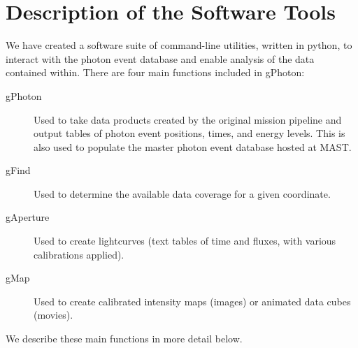 \documentclass[preprint]{aastex}
\begin{document}
\section{Description of the Software Tools}
\label{softwaretools}
We have created a software suite of command-line utilities, written in python, to interact with the photon event database and enable analysis of the data contained within.  There are four main functions included in gPhoton:
\begin{description}
\item[gPhoton] Used to take data products created by the original mission pipeline and output tables of photon event positions, times, and energy levels.  This is also used to populate the master photon event database hosted at MAST.
\item[gFind] Used to determine the available data coverage for a given coordinate.
\item[gAperture] Used to create lightcurves (text tables of time and fluxes, with various calibrations applied).
\item[gMap] Used to create calibrated intensity maps (images) or animated data cubes (movies).
\end{description}

We describe these main functions in more detail below.
\end{document}
